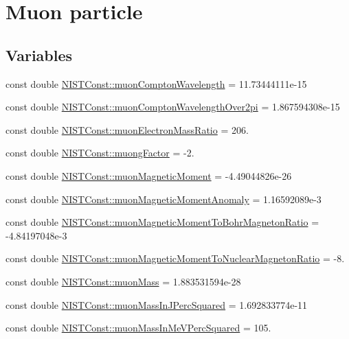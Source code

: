 \hypertarget{group___muon}{}\section{Muon particle}
\label{group___muon}
\subsection*{Variables}
\begin{DoxyCompactItemize}
\item 
const double \hyperlink{group___muon_ga344399a1ac3bc2f57614ccdca4f4f1c1}{N\+I\+S\+T\+Const\+::muon\+Compton\+Wavelength} = 11.\+73444111e-\/15
\item 
const double \hyperlink{group___muon_ga4a55b49a126bc1f308e50dfa6869cd76}{N\+I\+S\+T\+Const\+::muon\+Compton\+Wavelength\+Over2pi} = 1.\+867594308e-\/15
\item 
const double \hyperlink{group___muon_gadb71fd23b688fbab91f52a53eee8081c}{N\+I\+S\+T\+Const\+::muon\+Electron\+Mass\+Ratio} = 206.
\item 
const double \hyperlink{group___muon_ga777044d532403774e1c4a55ff020766d}{N\+I\+S\+T\+Const\+::muong\+Factor} = -\/2.
\item 
const double \hyperlink{group___muon_gacd182505756807ab247465449d821110}{N\+I\+S\+T\+Const\+::muon\+Magnetic\+Moment} = -\/4.\+49044826e-\/26
\item 
const double \hyperlink{group___muon_ga555a2705f41a9f392e90147c58ae7527}{N\+I\+S\+T\+Const\+::muon\+Magnetic\+Moment\+Anomaly} = 1.\+16592089e-\/3
\item 
const double \hyperlink{group___muon_ga417520e932b056d62595de6d9a75be3e}{N\+I\+S\+T\+Const\+::muon\+Magnetic\+Moment\+To\+Bohr\+Magneton\+Ratio} = -\/4.\+84197048e-\/3
\item 
const double \hyperlink{group___muon_gac809a61292c5b8c5fe4679bd944729d8}{N\+I\+S\+T\+Const\+::muon\+Magnetic\+Moment\+To\+Nuclear\+Magneton\+Ratio} = -\/8.
\item 
const double \hyperlink{group___muon_ga4fed15b8e94009be07c0a5f17af9ffb8}{N\+I\+S\+T\+Const\+::muon\+Mass} = 1.\+883531594e-\/28
\item 
const double \hyperlink{group___muon_ga98b4dada2be08e51ae363d18d745d60e}{N\+I\+S\+T\+Const\+::muon\+Mass\+In\+J\+Perc\+Squared} = 1.\+692833774e-\/11
\item 
const double \hyperlink{group___muon_ga781e348a83468d065630fd1b6da85eab}{N\+I\+S\+T\+Const\+::muon\+Mass\+In\+Me\+V\+Perc\+Squared} = 105.

\end{DoxyCompactItemize}
